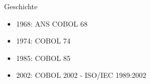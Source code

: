 \begin{slide}{Geschichte}
	\begin{itemize}
		\item{1968: ANS COBOL 68}
		\item{1974: COBOL 74}
		\item{1985: COBOL 85}
		\item{2002: COBOL 2002 - ISO/IEC 1989:2002}
	\end{itemize}
\end{slide}
